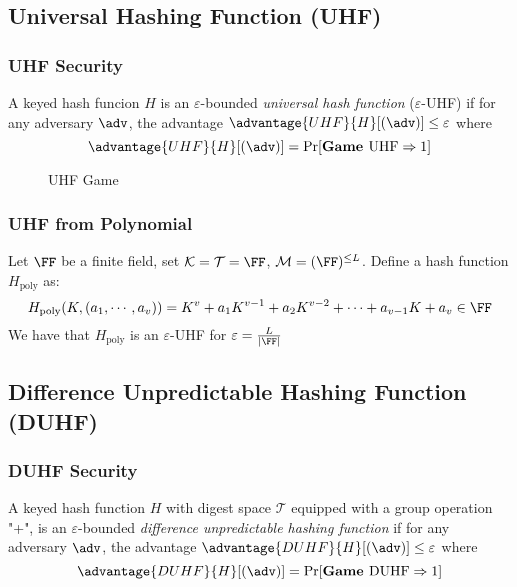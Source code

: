 \documentclass[11pt,a4paper]{article}
\begin{document}
\subsection{Universal Hashing Function (UHF)}
\subsubsection{UHF Security} A keyed hash funcion $H$ is an $\varepsilon$-bounded \textit{universal hash function} ($\varepsilon$-UHF) if for any adversary $\adv$, the advantage $\advantage{UHF}{H}[(\adv)] \leq \varepsilon$ where 
$$
\advantage{UHF}{H}[(\adv)] = \Pr[\textbf{Game } \text{UHF} \Rightarrow 1]
$$

\begin{figure}[H]
\begin{pchstack}[center , boxed, space=0.5cm]
\end{pchstack}
\caption{UHF Game}
\label{fig:uhf-game}
\end{figure}

\subsubsection{UHF from Polynomial}
Let $\FF$ be a finite field, set $\mathcal{K} = \mathcal{T} = \FF$, $\mathcal{M} = (\FF)^{\leq L}$. Define a hash function $H_\text{poly}$ as:
$$
H_\text{poly}(K, (a_1, \cdots, a_v)) = K^v + a_1K^{v-1} + a_2K^{v-2} + \cdots + a_{v-1}K + a_v \in \FF
$$
We have that $H_\text{poly}$ is an $\varepsilon$-UHF for $\varepsilon = \frac{L}{|\FF|}$ 

\subsection{Difference Unpredictable Hashing Function (DUHF)}
\subsubsection{DUHF Security} A keyed hash function $H$ with digest space $\mathcal{T}$ equipped with a group operation "+", is an $\varepsilon$-bounded \textit{difference unpredictable hashing function} if for any adversary $\adv$, the advantage $\advantage{DUHF}{H}[(\adv)] \leq \varepsilon$ where 
$$
\advantage{DUHF}{H}[(\adv)] = \Pr[\textbf{Game } \text{DUHF} \Rightarrow 1]
$$
\end{document}
